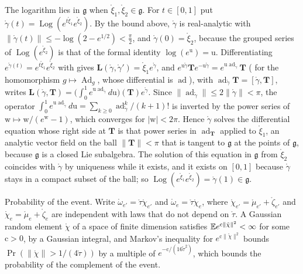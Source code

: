 The logarithm lies in \(\mathfrak g\) when \(\mathring\xi_1,\mathring\xi_2\in\mathfrak g\). For \(t\in[0,1]\) put
\(\mathring\gamma(t)=\operatorname{Log}(e^{t\mathring\xi_1}e^{\mathring\xi_2})\). By the bound above,
\(\mathring\gamma\) is real-analytic with
\(\lVert\mathring\gamma(t)\rVert\leq-\log(2-e^{1/2})<\frac\pi2\), and \(\mathring\gamma(0)=\mathring\xi_2\), because
the grouped series of \(\operatorname{Log}(e^{\mathring\xi_2})\) is that of the formal identity
\(\log(e^{\mathrm u})=\mathrm u\). Differentiating \(e^{\mathring\gamma(t)}=e^{t\mathring\xi_1}e^{\mathring\xi_2}\)
with  gives \(\mathbf L(\mathring\gamma,\mathring\gamma')=\mathring\xi_1e^{\mathring\gamma}\),
and \(e^{\mathrm u\mathring\gamma}\mathbf Te^{-\mathrm u\mathring\gamma}=e^{\mathrm u\operatorname{ad}_{\mathring\gamma}}\mathbf T\)
( for the homomorphism \(g\mapsto\operatorname{Ad}_g\), whose differential is
\(\operatorname{ad}\)), with
\(\operatorname{ad}_{\mathring\gamma}\mathbf T=[\mathring\gamma,\mathbf T]\), writes
\(\mathbf L(\mathring\gamma,\mathbf T)=\bigl(\int_0^1e^{\mathrm u\operatorname{ad}_{\mathring\gamma}}d\mathrm u\bigr)(\mathbf T)e^{\mathring\gamma}\).
Since \(\lVert\operatorname{ad}_{\mathring\gamma}\rVert\leq2\lVert\mathring\gamma\rVert<\pi\), the operator
\(\int_0^1e^{\mathrm u\operatorname{ad}_{\mathring\gamma}}d\mathrm u=\sum_{k\geq0}\operatorname{ad}_{\mathring\gamma}^k/(k+1)!\) is
inverted by the power series of \(\mathrm w\mapsto\mathrm w/(e^{\mathrm w}-1)\), which converges for
\(\lvert\mathrm w\rvert<2\pi\). Hence
\(\mathring\gamma\) solves the differential equation whose right side at \(\mathbf T\) is that power series in
\(\operatorname{ad}_{\mathbf T}\) applied to \(\mathring\xi_1\), an analytic vector field on the ball
\(\lVert\mathbf T\rVert<\pi\) that is tangent to \(\mathfrak g\) at the points of \(\mathfrak g\), because
\(\mathfrak g\) is a closed Lie subalgebra. The solution of this equation in \(\mathfrak g\) from
\(\mathring\xi_2\) coincides with \(\mathring\gamma\) by uniqueness while it exists, and it exists on \([0,1]\)
because \(\mathring\gamma\) stays in a compact subset of the ball; so
\(\operatorname{Log}(e^{\mathring\xi_1}e^{\mathring\xi_2})=\mathring\gamma(1)\in\mathfrak g\).

Probability of the event. Write \(\mathring\omega_{e'}=\mathring\tau\mathring\chi_{e'}\) and
\(\mathring\omega_e=\mathring\tau\mathring\chi_e\), where \(\mathring\chi_{e'}=\mathring\mu_{e'}+\mathring\zeta_{e'}\)
and \(\mathring\chi_e=\mathring\mu_e+\mathring\zeta_e\) are independent with laws that do not depend on
\(\mathring\tau\). A Gaussian random element \(\mathring\chi\) of a space of finite dimension satisfies
\(\mathbb E e^{\mathrm c\lVert\mathring\chi\rVert^2}<\infty\) for some \(\mathrm c>0\), by a Gaussian integral, and
Markov's inequality for \(e^{\mathrm c\lVert\mathring\chi\rVert^2}\) bounds
\(\Pr(\lVert\mathring\chi\rVert>1/(4\mathring\tau))\) by a multiple of \(e^{-\mathrm c/(16\mathring\tau^2)}\), which
bounds the probability of the complement of the event.

